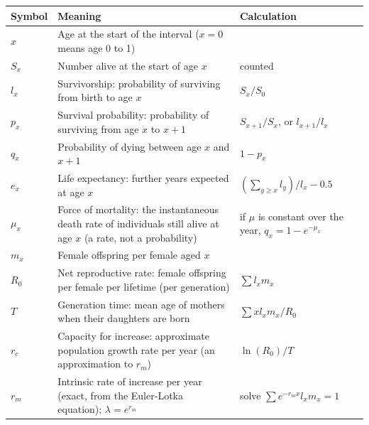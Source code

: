 \documentclass[
  a4paper]{book}
\newcounter{none} %
\begin{document}
{\def\LTcaptype{none} %
\begin{longtable}[]{@{}
  >{\raggedright\arraybackslash}p{}
  >{\raggedright\arraybackslash}p{}
  >{\raggedright\arraybackslash}p{}@{}}
\toprule\noalign{}
\begin{minipage}[b]{\linewidth}\raggedright
Symbol
\end{minipage} & \begin{minipage}[b]{\linewidth}\raggedright
Meaning
\end{minipage} & \begin{minipage}[b]{\linewidth}\raggedright
Calculation
\end{minipage} \\
\midrule\noalign{}
\endhead
\bottomrule\noalign{}
\endlastfoot
\(x\) & Age at the start of the interval (\(x = 0\) means age 0 to 1) & \\
\(S_x\) & Number alive at the start of age \(x\) & counted \\
\(l_x\) & Survivorship: probability of surviving from birth to age \(x\) & \(S_x/S_0\) \\
\(p_x\) & Survival probability: probability of surviving from age \(x\) to \(x+1\) & \(S_{x+1}/S_x\), or \(l_{x+1}/l_x\) \\
\(q_x\) & Probability of dying between age \(x\) and \(x+1\) & \(1 - p_x\) \\
\(e_x\) & Life expectancy: further years expected at age \(x\) & \(\left(\sum_{y \ge x} l_y\right)/l_x - 0.5\) \\
\(\mu_x\) & Force of mortality: the instantaneous death rate of individuals still alive at age \(x\) (a rate, not a probability) & if \(\mu\) is constant over the year, \(q_x = 1 - e^{-\mu_x}\) \\
\(m_x\) & Female offspring per female aged \(x\) & \\
\(R_0\) & Net reproductive rate: female offspring per female per lifetime (per generation) & \(\sum l_x m_x\) \\
\(T\) & Generation time: mean age of mothers when their daughters are born & \(\sum x l_x m_x / R_0\) \\
\(r_c\) & Capacity for increase: approximate population growth rate per year (an approximation to \(r_m\)) & \(\ln(R_0)/T\) \\
\(r_m\) & Intrinsic rate of increase per year (exact, from the Euler-Lotka equation); \(\lambda = e^{r_m}\) & solve \(\sum e^{-r_m x} l_x m_x = 1\) \\
\end{longtable}
}
\end{document}
